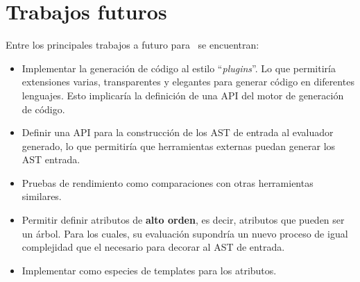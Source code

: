 \section{Trabajos futuros}
Entre los principales trabajos a futuro para \maggen\ se encuentran:
\begin{itemize}

\item Implementar la generación de código al estilo ``\textit{plugins}''. Lo que permitiría extensiones varias, transparentes y elegantes para generar código en diferentes lenguajes. Esto implicaría la definición de una API del motor de generación de código.

\item Definir una API para la construcción de los AST de entrada al evaluador generado, lo que permitiría que herramientas externas puedan generar los AST entrada.

\item Pruebas de rendimiento como comparaciones con otras herramientas similares.

\item Permitir definir atributos de \textbf{alto orden}, es decir, atributos que pueden ser un árbol. Para los cuales, su evaluación supondría un nuevo proceso de igual complejidad que el necesario para decorar al AST de entrada.

\item Implementar como especies de templates para los atributos.

\end{itemize}
